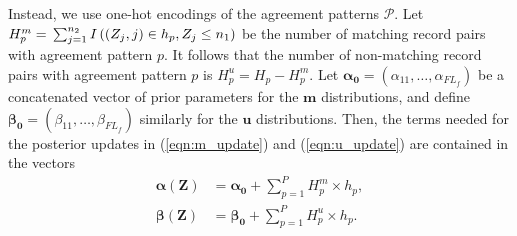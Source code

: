 \documentclass[ba]{imsart}
\begin{document}
Instead, we use one-hot encodings of the agreement patterns $\mathcal{P}$. Let $H_p^m = \\ \sum_{j=1}^{n_2} I\left((Z_j, j) \in h_p, Z_j \leq n_1 \right)$ be the number of matching record pairs with agreement pattern $p$. It follows that the number of non-matching record pairs with agreement pattern $p$ is \(H_p^u = H_p - H_p^m\). Let $\bm{\alpha_0} = (\alpha_{11}, \ldots, \alpha_{F L_f})$ be a concatenated vector of prior parameters for the $\bm{m}$ distributions, and define  $\bm{\beta_0} = (\beta_{11}, \ldots, \beta_{F L_f})$ similarly for the $\bm{u}$ distributions. Then, the terms needed for the posterior updates in (\ref{eqn:m_update}) and (\ref{eqn:u_update}) are contained in the vectors
\begin{subequations}
\begin{align}
\bm{\alpha(Z)} &= \bm{\alpha_0} + \sum_{p=1}^P H_p^m \times h_p, \label{efficient_alpha} \\
\bm{\beta(Z)} &= \bm{\beta_0} + \sum_{p=1}^P H_p^u \times h_p. \label{efficient_alpha}
\end{align}
\end{subequations}
\end{document}
